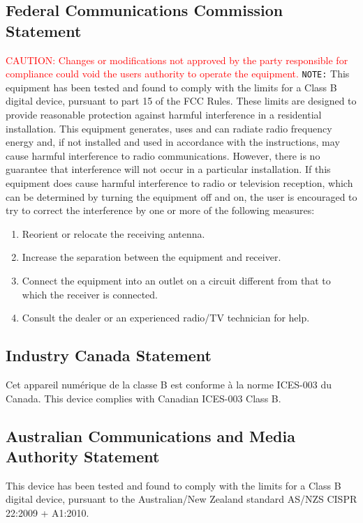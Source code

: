 \subsection{Federal Communications Commission Statement}
\textcolor{red}{CAUTION: Changes or modifications not approved by the party responsible for compliance could void the users authority to operate the equipment.}
\texttt{NOTE:} This equipment has been tested and found to comply with the limits for a Class B digital device, pursuant to part 15 of the FCC Rules. These limits are designed to provide reasonable protection against harmful interference in a residential installation. This equipment generates, uses and can radiate radio frequency energy and, if not installed and used in accordance with the instructions, may cause harmful interference to radio communications. However, there is no guarantee that interference will not occur in a particular installation. If this equipment does cause harmful interference to radio or television reception, which can be determined by turning the equipment off and on, the user is encouraged to try to correct the interference by one or more of the following measures:
\begin{enumerate}
\item Reorient or relocate the receiving antenna.
\item Increase the separation between the equipment and receiver.
\item Connect the equipment into an outlet on a circuit different from that to which the receiver
is connected.
\item Consult the dealer or an experienced radio/TV technician for help.
\end{enumerate}

\subsection{Industry Canada Statement}
Cet appareil numérique de la classe B est conforme à la norme ICES-003 du Canada.
This device complies with Canadian ICES-003 Class B.

\subsection{Australian Communications and Media Authority Statement}
This device has been tested and found to comply with the limits for a Class B digital device, pursuant to the Australian/New Zealand standard AS/NZS CISPR 22:2009 + A1:2010.

